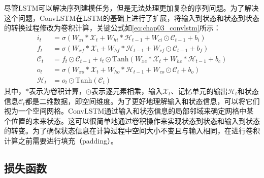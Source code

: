 尽管LSTM可以解决序列建模任务，但是无法处理更加复杂的序列问题。为了解决这个问题，ConvLSTM在LSTM的基础上进行了扩展，将输入到状态和状态到状态的转换过程修改为卷积计算，关键公式如\ref{eq:chap03_convlstm}所示：
\begin{equation}
  \begin{aligned}
    i_t           & = \sigma(W_{xi} \ast \mathcal{X}_t + W_{hi} \ast \mathcal{H}_{t-1} + W_{ci} \odot \mathcal{C}_{t-1} + b_i)          \\
    f_t           & = \sigma(W_{xf} \ast \mathcal{X}_t + W_{hf} \ast \mathcal{H}_{t-1} + W_{cf} \odot \mathcal{C}_{t-1} + b_f)          \\
    \mathcal{C}_t & = f_t \odot \mathcal{C}_{t-1} + i_t \odot \text{Tanh}(W_{xc} \ast \mathcal{X}_t + W_{hc} * \mathcal{H}_{t-1} + b_c) \\
    o_t           & = \sigma(W_{xo} \ast \mathcal{X}_t + W_{ho} \ast \mathcal{H}_{t-1} + W_{co} \odot \mathcal{C}_{t} + b_o)            \\
    \mathcal{H}_t & = o_t \odot \text{Tanh}(\mathcal{C}_t)
  \end{aligned}
  \label{eq:chap03_convlstm}
\end{equation}
其中，\(\ast\)表示为卷积计算，\(\odot\)表示逐元素相乘，输入\(\mathcal{X}_t\)、记忆单元的输出\(\mathcal{H}_t\)和状态信息\(\mathcal{C}_t\)都是二维数据，即空间维度。为了更好地理解输入和状态信息，可以将它们视为一个空间网格。ConvLSTM通过输入和状态信息的局部邻域来确定网格中某个位置的未来状态。这可以很简单地通过卷积操作来实现状态到状态和输入到状态的转变。为了确保状态信息在计算过程中空间大小不变且与输入相同，在进行卷积计算之前需要进行填充（padding）。

\subsection{损失函数}

